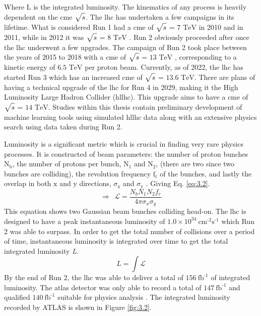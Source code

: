 Where $\textrm{L}$ is the integrated luminosity. The kinematics of any process is heavily dependent on the 
\gls{cme} $\sqrt{\mathstrut{s}}$. The \gls{lhc} has undertaken a few campaigns in its lifetime. What is 
considered Run 1 had a \gls{cme} of $ \sqrt{\mathstrut{s}}$ =  $\textrm{7 TeV}$  in 2010 and in 2011, while in 2012 it 
was $\sqrt{\mathstrut{s}}$ = $\textrm{8 TeV}$ \cite{run1}. Run 2 obviously proceeded after once the \gls{lhc} underwent a few upgrades.
The campaign of Run 2 took place between the years of 2015 to 2018 with a \gls{cme} of 
$\sqrt{\mathstrut{s}}$ =  $\textrm{13 TeV}$ \cite{run2}, corresponding to a kinetic energy of $\textrm{6.5 TeV}$ per proton beam. 
Currently, as of 2022, the \gls{lhc} has started Run 3 which has an increased \gls{cme} of 
$\sqrt{\mathstrut{s}}$ = $\textrm{13.6 TeV}$. There are plans of having a technical upgrade of the \gls{lhc} for Run 4 in 2029,  
making it the High Luminosity Large Hadron Collider (\gls{hllhc}). This upgrade aims to have a \gls{cme} of $\sqrt{\mathstrut{s}}$ = $\textrm{14 TeV}$.
Studies within this thesis contain preliminary development of machine learning tools using simulated \gls{hllhc}
data along with an extensive physics search using data taken during Run 2. 
\par
Luminosity is a significant metric which is crucial in finding very rare physics processes. It is constructed of 
beam parameters: the number of proton bunches $\textrm{N}_{\textrm{b}}$, the number of protons per bunch, $\textrm{N}_{\textrm{1}}$ and $\textrm{N}_{\textrm{2}}$,
(there are two since two bunches are colliding), the revolution frequency $\textrm{f}_{\textrm{r}}$ of the bunches, and lastly 
the overlap in both $\textrm{x}$ and $\textrm{y}$ directions, $\sigma_{\textrm{x}}$ and $\sigma_{\textrm{y}}$ \cite{lumi}. Giving Eq. \ref{eq:3.2}.
%
\begin{equation}\label{eq:3.2}
    \Longrightarrow \ \ \mathcal{L} = \frac{N_{b}N_{1}N_{2}f_{r}}{4\pi \sigma_{x}\sigma_{y}}
\tag{3.2}
\end{equation}
%
This equation shows two Gaussian beam bunches colliding head-on. The \gls{lhc} is designed to have a peak instantaneous 
luminosity of $\textrm{1.0}\times \textrm{10}^{\textrm{34}} \ \textrm{cm}^{\textrm{-2}}\textrm{s}^{\textrm{-1}}$ which Run 2 was able to surpass. In order to get the total number of collisions 
over a period of time, instantaneous luminosity is integrated over time to get the total integrated luminosity \textit{L}.
%
\begin{equation}\label{eq:3.3}
  L = \int \mathcal{L}
\tag{3.3}
\end{equation}
%
By the end of Run 2, the \gls{lhc} was able to deliver a total of $\textrm{156}\ \textrm{fb}^{\textrm{-1}}$ of integrated luminosity. 
The \gls{atlas} detector was only able to record a total of $\textrm{147}\ \textrm{fb}^{\textrm{-1}}$ and qualified $\textrm{140}\ \textrm{fb}^{\textrm{-1}}$ suitable 
for physics analysis \cite{lumi}. The integrated luminosity recorded by ATLAS is shown in Figure \ref{fig:3.2}. 

